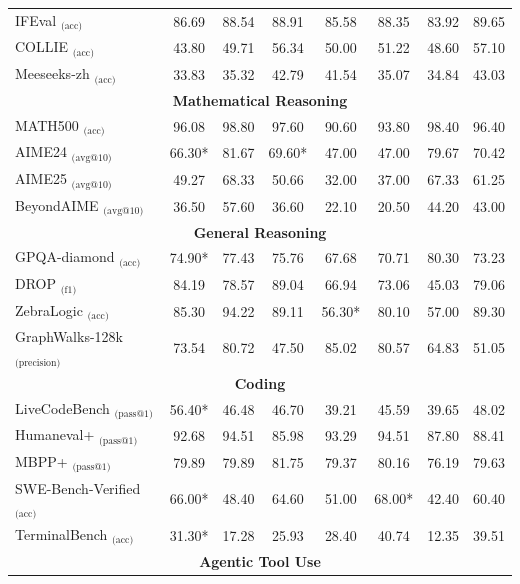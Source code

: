 \documentclass{article}
\begin{document}
\begin{table}[htbp]
{\begin{tabular}{l|ccc|ccc|c}
 \midrule 
         IFEval $_{\text{(acc)}}$ & 86.69 & 88.54 & 88.91 & 85.58 & 88.35 & 83.92 & 89.65 \\ 
         COLLIE $_{\text{(acc)}}$ & 43.80 & 49.71 & 56.34 & 50.00 & 51.22 & 48.60 & 57.10 \\ 
         Meeseeks-zh $_{\text{(acc)}}$ & 33.83 & 35.32 & 42.79 & 41.54 & 35.07 & 34.84 & 43.03 \\ 
         \midrule 
       
  \multicolumn{8}{c}{\textbf{Mathematical Reasoning}} \\ 
         \midrule 
         MATH500 $_{\text{(acc)}}$  & 96.08 & 98.80 & 97.60 & 90.60 & 93.80 & 98.40 & 96.40 \\ 
         AIME24 $_{\text{(avg@10)}}$  & 66.30* & 81.67 & 69.60* & 47.00 & 47.00 & 79.67 &  70.42 \\ 
         AIME25 $_{\text{(avg@10)}}$  & 49.27 & 68.33 & 50.66 & 32.00 & 37.00 & 67.33 & 61.25 \\ 
    
     BeyondAIME $_{\text{(avg@10)}}$ & 36.50 & 57.60 & 36.60 & 22.10 & 20.50 & 44.20 & 43.00 \\ 
         \midrule 
         \multicolumn{8}{c}{\textbf{General Reasoning}} \\ 
         \midrule 
         GPQA-diamond $_{\text{(acc)}}$ & 74.90* & 77.43 & 75.76 & 67.68 & 70.71 & 80.30 & 73.23 \\ 
         DROP $_{\text{(f1)}}$  & 84.19 & 78.57 & 89.04 & 66.94 & 73.06 & 45.03 & 79.06 \\ 
         ZebraLogic $_{\text{(acc)}}$  & 85.30 & 94.22 & 89.11 & 56.30* & 80.10 & 57.00 & 89.30 \\ 
         GraphWalks-128k $_{\text{(precision)}}$  & 73.54 & 80.72 & 47.50 & 85.02 & 80.57 & 64.83 & 51.05 \\ 
         \midrule 
         \multicolumn{8}{c}{\textbf{Coding}} \\ 
         \midrule 
   
         LiveCodeBench $_{\text{(pass@1)}}$ & 56.40*  & 46.48 & 46.70 & 39.21 & 45.59 & 39.65 & 48.02 \\ 
      Humaneval+ $_{\text{(pass@1)}}$  & 92.68 & 94.51 & 85.98 & 93.29 & 94.51 & 87.80 & 88.41 \\ 
         MBPP+ $_{\text{(pass@1)}}$  & 79.89 & 79.89 & 81.75 & 79.37 & 80.16 & 76.19 & 79.63 \\ 
         SWE-Bench-Verified $_{\text{(acc)}}$  & 66.00* & 48.40 & 64.60 & 51.00 & 68.00* & 42.40 & 60.40 \\ 
         TerminalBench $_{\text{(acc)}}$ & 31.30* & 17.28 & 25.93 & 28.40 & 40.74 & 12.35 & 39.51 \\ 
         \midrule 
         \multicolumn{8}{c}{\textbf{Agentic Tool Use}} \\ 
         \midrule 
         

\end{tabular}}
\end{table}
\end{document}
